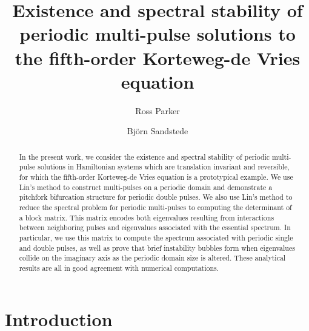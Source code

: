 \documentclass[10pt,reqno]{amsart}
\theoremstyle{plain}
\theoremstyle{definition}
\theoremstyle{remark}
\numberwithin{theorem}{section}
\numberwithin{equation}{section}
\begin{document}
\title[Periodic Multi-Pulses to KdV5]{Existence and spectral stability of periodic multi-pulse solutions to the fifth-order Korteweg-de Vries equation}

\author{Ross Parker}
\address{Division of Applied Mathematics, Brown University, 
Providence, RI 02912}

\author{Bj\"orn Sandstede}
\address{Division of Applied Mathematics, Brown University, 
Providence, RI 02912}

\begin{abstract}
In the present work, we consider the existence and spectral stability of periodic multi-pulse solutions in Hamiltonian systems which are translation invariant and reversible, for which the fifth-order Korteweg-de Vries equation is a prototypical example. We use Lin's method to construct multi-pulses on a periodic domain and demonstrate a pitchfork bifurcation structure for periodic double pulses. We also use Lin's method to reduce the spectral problem for periodic multi-pulses to computing the determinant of a block matrix. This matrix encodes both eigenvalues resulting from interactions between neighboring pulses and eigenvalues associated with the essential spectrum. In particular, we use this matrix to compute the spectrum associated with periodic single and double pulses, as well as prove that brief instability bubbles form when eigenvalues collide on the imaginary axis as the periodic domain size is altered. These analytical results are all in good agreement with numerical computations.
\end{abstract}

\maketitle

\section{Introduction}\label{sec:intro}
\end{document}

